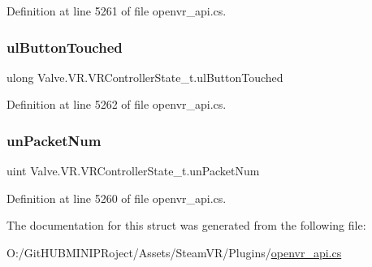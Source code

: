 Definition at line 5261 of file openvr\+\_\+api.\+cs.

\mbox{\label{struct_valve_1_1_v_r_1_1_v_r_controller_state__t_a8847792f0982e92064304172718ae211}} 
\subsubsection{\texorpdfstring{ulButtonTouched}{ulButtonTouched}}
{\footnotesize\ttfamily ulong Valve.\+V\+R.\+V\+R\+Controller\+State\+\_\+t.\+ul\+Button\+Touched}



Definition at line 5262 of file openvr\+\_\+api.\+cs.

\mbox{\label{struct_valve_1_1_v_r_1_1_v_r_controller_state__t_a2b0664725a9edc5d20cd2a103b294a34}} 
\subsubsection{\texorpdfstring{unPacketNum}{unPacketNum}}
{\footnotesize\ttfamily uint Valve.\+V\+R.\+V\+R\+Controller\+State\+\_\+t.\+un\+Packet\+Num}



Definition at line 5260 of file openvr\+\_\+api.\+cs.



The documentation for this struct was generated from the following file\+:\begin{DoxyCompactItemize}
\item 
O\+:/\+Git\+H\+U\+B\+M\+I\+N\+I\+P\+Roject/\+Assets/\+Steam\+V\+R/\+Plugins/\mbox{\hyperlink{openvr__api_8cs}{openvr\+\_\+api.\+cs}}\end{DoxyCompactItemize}
